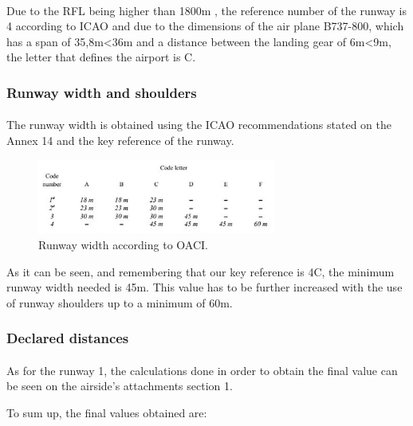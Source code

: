 		\paragraph{}Due to the RFL being higher than 1800m , the reference number of the runway is 4 according to ICAO and due to the dimensions of the air plane B737-800, which has a span of 35,8m<36m and a distance between the landing gear of 6m<9m, the letter that defines the airport is C.
	
		\subsubsection{Runway width and shoulders}
		\paragraph{}The runway width is obtained using the ICAO recommendations stated on the Annex 14 and the key reference of the runway. 
	
		\begin{figure}[H]
			\centering
			\includegraphics[clip, trim=0cm 0cm 0cm 0cm, width=0.7\textwidth]{./images/Annex14/RunwayWidth}
			\caption{Runway width according to OACI.} %
			\label{} %
		\end{figure}
	
		As it can be seen, and remembering that our key reference is 4C, the minimum runway width needed is 45m. This value has to be further increased with the use of runway shoulders up to a minimum of 60m. 
	
		\subsubsection{Declared distances}
		\paragraph{} As for the runway 1, the calculations done in order to obtain the final value can be seen on the airside’s attachments section 1. 
	
	To sum up, the final values obtained are:
	
